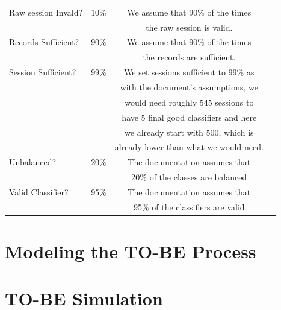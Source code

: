 \begin{table}[H]
\begin{tabularx}{\textwidth}{|X|c|c|c|}
    \hline
    Raw session Invald? & 10\% & We assume that 90\% of the times
    \\ & & the raw session is valid.\\
    \hline
    Records Sufficient? & 90\% & We assume that 90\% of the times
    \\ & & the records are sufficient.\\
    \hline
    Session Sufficient? & 99\% & We set sessions sufficient to 99\% as
    \\ & & with the document's assumptions, we 
    \\ & & would need roughly 545 sessions to 
    \\ & & have 5 final good classifiers and here
    \\ & &  we already start with 500, which is
    \\ & & already lower than what we would need.\\
    \hline
    Unbalanced? & 20\% & The documentation assumes that
    \\ & &  20\% of the classes are balanced\\
    \hline
    Valid Classifier? & 95\% & The documentation assumes that
    \\ & &  95\% of the classifiers are valid\\
    \hline

\end{tabularx}
\end{table}


\section{Modeling the TO-BE Process}
\label{sec:modeling_to_be_processing}




\section{TO-BE Simulation}
\label{sec:to_be_simulation}












